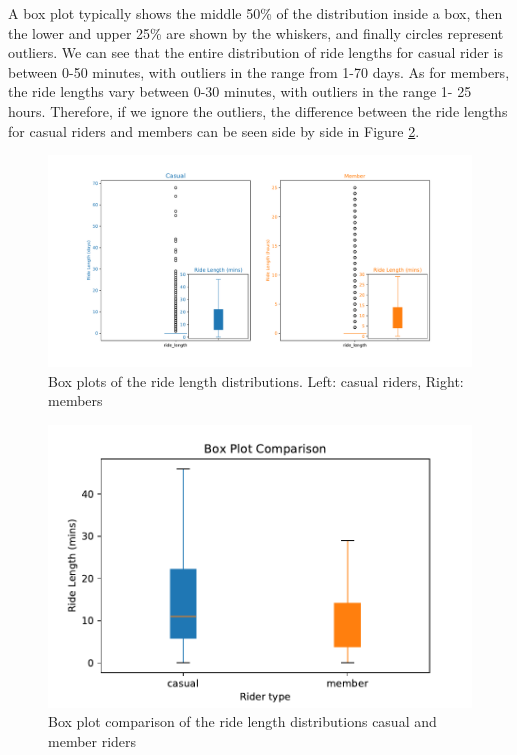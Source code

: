 \documentclass[12pt]{article}
\begin{document}
\begin{itemize}
A box plot typically shows the middle 50\% of the distribution inside a box, then the lower and upper 25\% are shown by the whiskers, and finally circles represent outliers. We can see that the entire distribution of ride lengths for casual rider is between 0-50 minutes, with outliers in the range from 1-70 days. As for members, the ride lengths vary between 0-30 minutes, with outliers in the range 1- 25 hours. Therefore, if we ignore the outliers, the difference between the ride lengths for casual riders and members can be seen side by side in Figure \ref{fig15}.
	
	\begin{figure}[h]
	\hspace{-0.5in}
	\includegraphics[scale=0.6]{boxplot_distribution.pdf} 
	\caption{Box plots of the ride length distributions. Left: casual riders, Right: members}
	\label{fig13}
	\end{figure}
	
	\begin{figure}[h]
	\centering
	\includegraphics[scale=0.6]{boxplot_distribution2.pdf} 
	\caption{Box plot comparison of the ride length distributions casual and member riders}
	\label{fig15}
	\end{figure}


\end{itemize}
\end{document}
